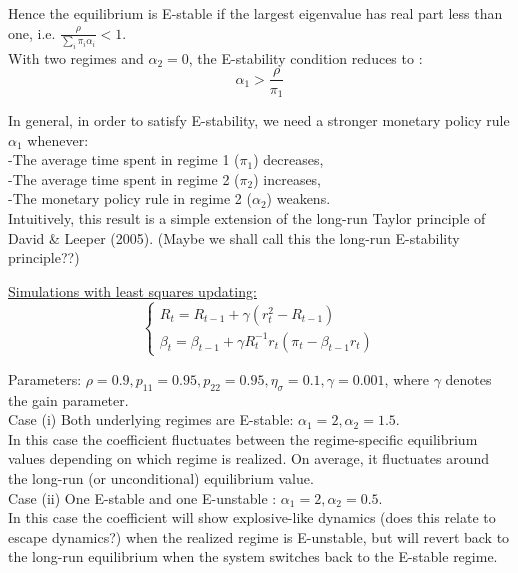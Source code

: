 \documentclass[12pt,reqno]{article}
\numberwithin{equation}{section}
\begin{document}
Hence the equilibrium is E-stable if the largest eigenvalue has real part less than one, i.e. $\frac{\rho}{\sum_i \pi_i \alpha_i} < 1 $. \\

With two regimes and $\alpha_2 = 0 $, the E-stability condition reduces to : \\

$$ \alpha_1 > \frac{\rho}{\pi_1} $$


In general, in order to satisfy E-stability, we need a stronger monetary policy rule $\alpha_1 $ whenever: \\

-The average time spent in regime 1 ($\pi_1 $) decreases, \\
-The average time spent in regime 2 ($\pi_2 $) increases, \\
-The monetary policy rule in regime 2 ($\alpha_2 $) weakens.\\

Intuitively, this result is a simple extension of the long-run Taylor principle of David \& Leeper (2005). (Maybe we shall call this the long-run E-stability principle??) \\


\newpage

\underline{Simulations with least squares updating:}\\

$$
\begin{cases}
R_t = R_{t-1} + \gamma (r_t^2 - R_{t-1} ) \\
\beta_t = \beta_{t-1} + \gamma R_t^{-1} r_t (\pi_t - \beta_{t-1} r_t) 
\end{cases}
$$

Parameters: $\rho = 0.9, p_{11}=0.95, p_{22}= 0.95, \eta_{\sigma} = 0.1, \gamma=0.001 $, where $\gamma $ denotes the gain parameter. \\

Case (i) Both underlying regimes are E-stable: $ \alpha_1 = 2, \alpha_2 = 1.5 $. \\
In this case the coefficient fluctuates between the regime-specific equilibrium values depending on which regime is realized. On average, it fluctuates around the long-run (or unconditional) equilibrium value. \\

Case (ii) One E-stable and one E-unstable : $ \alpha_1 = 2, \alpha_2 = 0.5 $. \\
In this case the coefficient will show explosive-like dynamics (does this relate to escape dynamics?) when the realized regime is E-unstable, but will revert back to the long-run equilibrium when the system switches back to the E-stable regime. 
\end{document}
